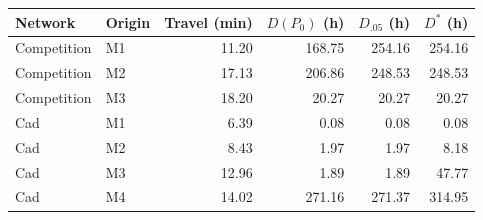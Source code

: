 \begin{tabular}{llrrrr}\toprule Network & Origin & Travel (min) & $D(P_0)$ (h) & $D_{.05}$ (h) & $D^*$ (h)\\\midrule
Competition & M1 & 11.20 & 168.75 & 254.16 & 254.16 \\
Competition & M2 & 17.13 & 206.86 & 248.53 & 248.53 \\
Competition & M3 & 18.20 & 20.27 & 20.27 & 20.27 \\
Cad & M1 & 6.39 & 0.08 & 0.08 & 0.08 \\
Cad & M2 & 8.43 & 1.97 & 1.97 & 8.18 \\
Cad & M3 & 12.96 & 1.89 & 1.89 & 47.77 \\
Cad & M4 & 14.02 & 271.16 & 271.37 & 314.95 \\
\bottomrule\end{tabular}